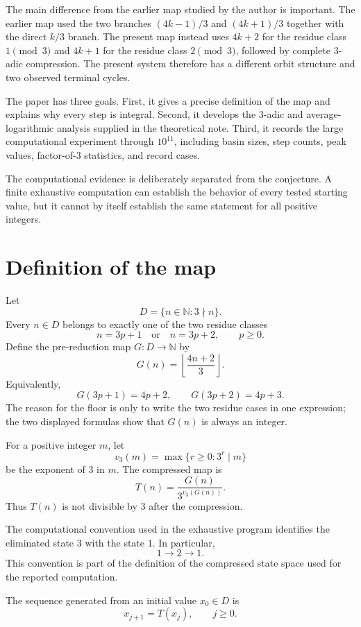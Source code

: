 \documentclass[11pt]{article}
\begin{document}
The main difference from the earlier map studied by the author is important. The earlier map used the two branches $(4k-1)/3$ and $(4k+1)/3$ together with the direct $k/3$ branch. The present map instead uses $4k+2$ for the residue class $1\pmod 3$ and $4k+1$ for the residue class $2\pmod 3$, followed by complete $3$-adic compression. The present system therefore has a different orbit structure and two observed terminal cycles.

The paper has three goals. First, it gives a precise definition of the map and explains why every step is integral. Second, it develops the $3$-adic and average-logarithmic analysis supplied in the theoretical note. Third, it records the large computational experiment through $10^{11}$, including basin sizes, step counts, peak values, factor-of-$3$ statistics, and record cases.

The computational evidence is deliberately separated from the conjecture. A finite exhaustive computation can establish the behavior of every tested starting value, but it cannot by itself establish the same statement for all positive integers.

\section{Definition of the map}
Let
\[
D=\{n\in\mathbb N:3\nmid n\}.
\]
Every $n\in D$ belongs to exactly one of the two residue classes
\[
n=3p+1\quad\text{or}\quad n=3p+2,
\qquad p\ge0.
\]
Define the pre-reduction map $G:D\to\mathbb N$ by
\[
G(n)=\left\lfloor\frac{4n+2}{3}\right\rfloor.
\]
Equivalently,
\[
G(3p+1)=4p+2,
\qquad
G(3p+2)=4p+3.
\]
The reason for the floor is only to write the two residue cases in one expression; the two displayed formulas show that $G(n)$ is always an integer.

For a positive integer $m$, let
\[
v_3(m)=\max\{r\ge0:3^r\mid m\}
\]
be the exponent of $3$ in $m$. The compressed map is
\[
T(n)=\frac{G(n)}{3^{v_3(G(n))}}.
\tag{1}
\]
Thus $T(n)$ is not divisible by $3$ after the compression.

The computational convention used in the exhaustive program identifies the eliminated state $3$ with the state $1$. In particular,
\[
1\longrightarrow2\longrightarrow1.
\]
This convention is part of the definition of the compressed state space used for the reported computation.

The sequence generated from an initial value $x_0\in D$ is
\[
x_{j+1}=T(x_j),\qquad j\ge0.
\]
\end{document}
